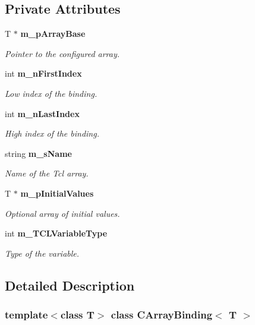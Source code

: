 \subsection*{Private Attributes}
\begin{CompactItemize}
\item 
T $\ast$ {\bf m\_\-p\-Array\-Base}
\begin{CompactList}\small\item\em Pointer to the configured array.\item\end{CompactList}\item 
int {\bf m\_\-n\-First\-Index}
\begin{CompactList}\small\item\em Low index of the binding.\item\end{CompactList}\item 
int {\bf m\_\-n\-Last\-Index}
\begin{CompactList}\small\item\em High index of the binding.\item\end{CompactList}\item 
string {\bf m\_\-s\-Name}
\begin{CompactList}\small\item\em Name of the Tcl array.\item\end{CompactList}\item 
T $\ast$ {\bf m\_\-p\-Initial\-Values}
\begin{CompactList}\small\item\em Optional array of initial values.\item\end{CompactList}\item 
int {\bf m\_\-TCLVariable\-Type}
\begin{CompactList}\small\item\em Type of the variable.\item\end{CompactList}\end{CompactItemize}


\subsection{Detailed Description}
\subsubsection*{template$<$class T$>$ class CArray\-Binding$<$ T $>$}

